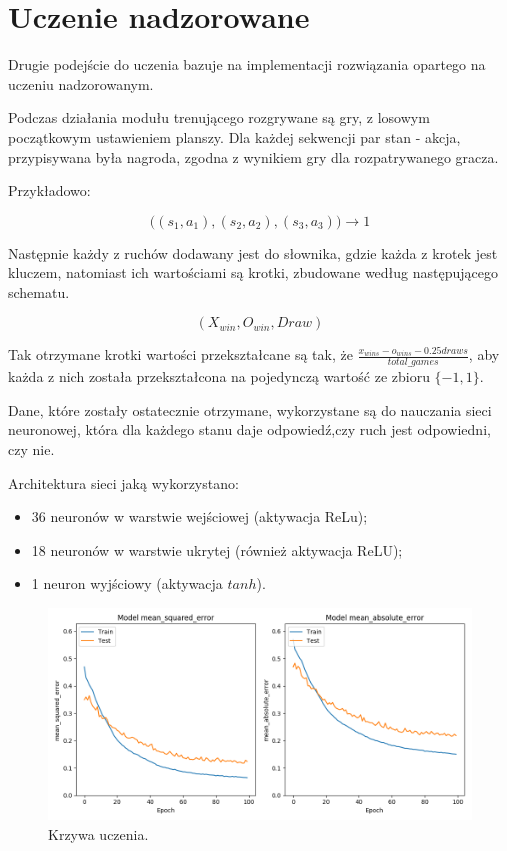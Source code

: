 \section{Uczenie nadzorowane}

Drugie podejście do uczenia bazuje na implementacji rozwiązania opartego na uczeniu nadzorowanym.

Podczas działania modułu trenującego rozgrywane są gry, z losowym początkowym ustawieniem planszy. Dla każdej sekwencji par stan - akcja, przypisywana była nagroda, zgodna z wynikiem gry dla rozpatrywanego gracza.

Przykładowo:

$$\big((s_{1}, a_{1}), (s_{2}, a_{2}), (s_{3}, a_{3})\big) \rightarrow 1$$

Następnie każdy z ruchów dodawany jest do słownika, gdzie każda z krotek jest kluczem, natomiast ich wartościami są krotki, zbudowane według następującego schematu.

$$(X_{win}, O_{win}, Draw)$$

Tak otrzymane krotki wartości przekształcane są tak, że $\frac{x_{wins} - o_{wins} - 0.25 draws}{total\_games}$, aby każda z nich została przekształcona na pojedynczą wartość ze zbioru $\{-1, 1\}$.

Dane, które zostały ostatecznie otrzymane, wykorzystane są do nauczania sieci neuronowej, która dla każdego stanu daje odpowiedź,czy ruch jest odpowiedni, czy nie.

Architektura sieci jaką wykorzystano:
\begin{itemize}
	\item 36 neuronów w warstwie wejściowej (aktywacja ReLu);
	\item 18 neuronów w warstwie ukrytej (również aktywacja ReLU);
	\item 1 neuron wyjściowy (aktywacja $tanh$).
\end{itemize}

\begin{figure}[H]
	\centering
	\includegraphics[width=0.7\linewidth]{imgs/nn_plots}
	\caption{Krzywa uczenia.}
\end{figure}

\pagebreak